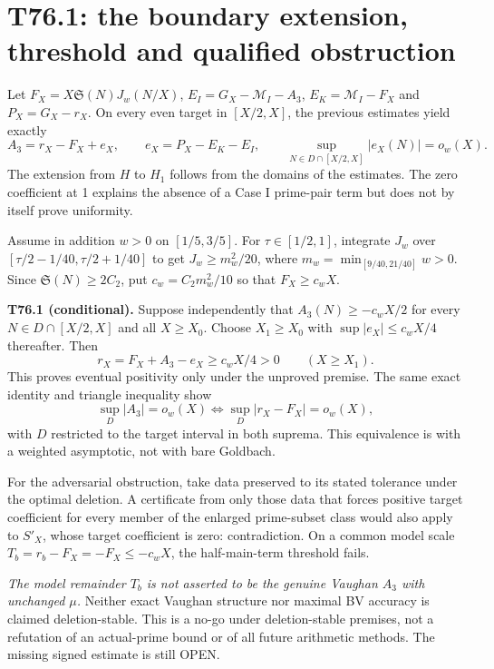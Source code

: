 \documentclass[11pt,a4paper]{article}
\newcommand{\Sg}{\mathfrak S}\newcommand{\e}{\mathrm e}
\begin{document}
\section{T76.1: the boundary extension, threshold and qualified obstruction}
Let $F_X=X\Sg(N)J_w(N/X)$, $E_I=G_X-\mathcal M_I-A_3$, $E_K=\mathcal M_I-F_X$ and $P_X=G_X-r_X$. On every even target in $[X/2,X]$, the previous estimates yield exactly
\[
 A_3=r_X-F_X+e_X,\qquad e_X=P_X-E_K-E_I,\qquad
 \sup_{N\in D\cap[X/2,X]}|e_X(N)|=o_w(X).
\]
The extension from $H$ to $H_1$ follows from the domains of the estimates. The zero coefficient at 1 explains the absence of a Case I prime-pair term but does not by itself prove uniformity.

Assume in addition $w>0$ on $[1/5,3/5]$. For $\tau\in[1/2,1]$, integrate $J_w$ over $[\tau/2-1/40,\tau/2+1/40]$ to get $J_w\ge m_w^2/20$, where $m_w=\min_{[9/40,21/40]}w>0$. Since $\Sg(N)\ge2C_2$, put $c_w=C_2m_w^2/10$ so that $F_X\ge c_wX$.

\textbf{T76.1 (conditional).} Suppose independently that $A_3(N)\ge-c_wX/2$ for every $N\in D\cap[X/2,X]$ and all $X\ge X_0$. Choose $X_1\ge X_0$ with $\sup|e_X|\le c_wX/4$ thereafter. Then
\[
 r_X=F_X+A_3-e_X\ge c_wX/4>0\qquad(X\ge X_1).
\]
This proves eventual positivity only under the unproved premise. The same exact identity and triangle inequality show
\[
 \sup_D|A_3|=o_w(X)\iff\sup_D|r_X-F_X|=o_w(X),
\]
with $D$ restricted to the target interval in both suprema. This equivalence is with a weighted asymptotic, not with bare Goldbach.

For the adversarial obstruction, take data preserved to its stated tolerance under the optimal deletion. A certificate from only those data that forces positive target coefficient for every member of the enlarged prime-subset class would also apply to $S'_X$, whose target coefficient is zero: contradiction. On a common model scale $T_b=r_b-F_X=-F_X\le-c_wX$, the half-main-term threshold fails.

\emph{The model remainder $T_b$ is not asserted to be the genuine Vaughan $A_3$ with unchanged $\mu$.} Neither exact Vaughan structure nor maximal BV accuracy is claimed deletion-stable. This is a no-go under deletion-stable premises, not a refutation of an actual-prime bound or of all future arithmetic methods. The missing signed estimate is still OPEN.
\newpage
\end{document}

